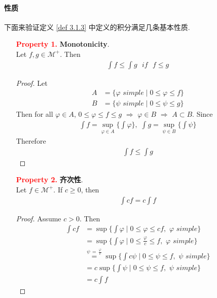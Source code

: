 \paragraph{性质}
	下面来验证定义 \ref{def 3.1.3} 中定义的积分满足几条基本性质.
	\begin{enumerate}
		\item[\textcolor{red}{\textbf{Property 1.}}]\textbf{Monotonicity}.\\
		Let $f , g \in \mathcal{M}^{+}$. Then
		\begin{align}
			\int{f} \leq \int{g} \,\,\,\, if \,\,\,\, f \leq g
		\end{align}
		
		\vspace{2em}
		\begin{proof}
			Let
			\begin{align}
				A &= \{ \varphi \,\, simple \mid 0 \leq \varphi \leq f \} \\
				B &= \{ \psi \,\, simple \mid 0 \leq \psi \leq g \}
			\end{align}
			Then for all $\varphi \in A$, $0 \leq \varphi \leq f \leq g$ $\Rightarrow$ $\varphi \in B$ $\Rightarrow$ $A \subset B$. Since
			\begin{align}
				\int{f} = \sup_{\varphi \in A}{\{ \int{\varphi} \}} , \,\, \int{g} = \sup_{\psi \in B}{\{ \int{\psi} \}}
			\end{align}
			Therefore
			\begin{align}
				\int{f} \leq \int{g}
			\end{align}
		\end{proof}
	
		\newpage
		
		\item[\textcolor{red}{\textbf{Property 2.}}]\textbf{齐次性}.\\
		Let $f \in \mathcal{M}^{+}$. If $c \geq 0$, then
		\begin{align}
			\int{cf} = c\int{f}
		\end{align}
	
		\vspace{2em}
		\begin{proof}
			Assume $c > 0$. Then
			\begin{align}
				\int{cf} 
				&= \sup{\{ \int{\varphi} \mid 0 \leq \varphi \leq cf , \,\, \varphi \,\, simple \}} \\
				&= \sup{\{ \int{\varphi} \mid 0 \leq \frac{\varphi}{c} \leq f , \,\, \varphi \,\, simple \}} \\
				&\overset{\psi \, = \, \frac{\varphi}{c}}{=} \sup{\{ \int{c\psi} \mid 0 \leq \psi \leq f , \,\, \psi \,\, simple \}} \\
				&= c \sup{\{ \int{\psi} \mid 0 \leq \psi \leq f , \,\, \psi \,\, simple \}} \\
				&= c \int{f}
			\end{align}
		\end{proof}
	\end{enumerate}

